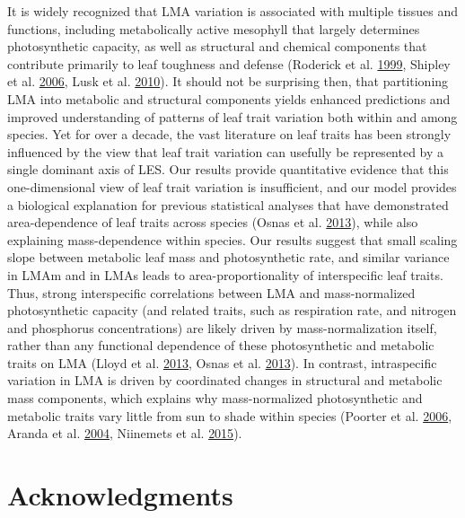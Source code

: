 \documentclass[
  12pt,
]{article}
\begin{document}
It is widely recognized that LMA variation is associated with multiple tissues and functions, including metabolically active mesophyll that largely determines photosynthetic capacity, as well as structural and chemical components that contribute primarily to leaf toughness and defense (Roderick et al. \protect\hyperlink{ref-Roderick1999}{1999}, Shipley et al. \protect\hyperlink{ref-Shipley2006}{2006}, Lusk et al. \protect\hyperlink{ref-Lusk2010}{2010}).
It should not be surprising then, that partitioning LMA into metabolic and structural components yields enhanced predictions and improved understanding of patterns of leaf trait variation both within and among species.
Yet for over a decade, the vast literature on leaf traits has been strongly influenced by the view that leaf trait variation can usefully be represented by a single dominant axis of LES.
Our results provide quantitative evidence that this one-dimensional view of leaf trait variation is insufficient, and our model provides a biological explanation for previous statistical analyses that have demonstrated area-dependence of leaf traits across species (Osnas et al. \protect\hyperlink{ref-Osnas2013}{2013}), while also explaining mass-dependence within species. Our results suggest that small scaling slope between metabolic leaf mass and photosynthetic rate, and similar variance in LMAm and in LMAs leads to area-proportionality of interspecific leaf traits.
Thus, strong interspecific correlations between LMA and mass-normalized photosynthetic capacity (and related traits, such as respiration rate, and nitrogen and phosphorus concentrations) are likely driven by mass-normalization itself, rather than any functional dependence of these photosynthetic and metabolic traits on LMA (Lloyd et al. \protect\hyperlink{ref-Lloyd2013}{2013}, Osnas et al. \protect\hyperlink{ref-Osnas2013}{2013}).
In contrast, intraspecific variation in LMA is driven by coordinated changes in structural and metabolic mass components, which explains why mass-normalized photosynthetic and metabolic traits vary little from sun to shade within species (Poorter et al. \protect\hyperlink{ref-Poorter2006b}{2006}, Aranda et al. \protect\hyperlink{ref-Aranda2004}{2004}, Niinemets et al. \protect\hyperlink{ref-Niinemets2015}{2015}).

\hypertarget{acknowledgments}{%
\section{Acknowledgments}\label{acknowledgments}}
\end{document}

